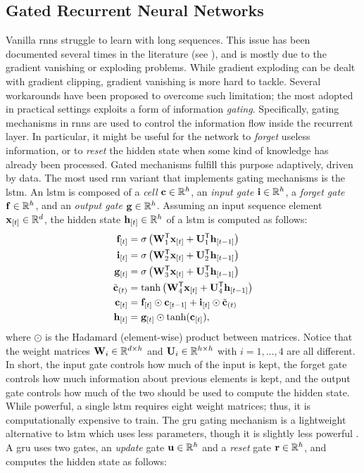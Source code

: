 \subsection{Gated Recurrent Neural Networks}
Vanilla \glspl{rnn} struggle to learn with long sequences. This issue has been documented several times in the literature (see \eg \cite{?}), and is mostly due to the gradient vanishing or exploding problems. While gradient exploding can be dealt with gradient clipping, gradient vanishing is more hard to tackle. Several workarounds have been proposed to overcome such limitation; the most adopted in practical settings exploits a form of information \emph{gating}. Specifically, gating mechanisms in \glspl{rnn} are used to control the information flow inside the recurrent layer. In particular, it might be useful for the network to \emph{forget} useless information, or to \emph{reset} the hidden state when some kind of knowledge has already been processed. Gated mechanisms fulfill this purpose adaptively, driven by data. The most used \gls{rnn} variant that implements gating mechanisms is the \gls{lstm}.
An \gls{lstm} is composed of a \emph{cell} $\Vector{c} \in \Real^h$, an \emph{input gate} $\Vector{i} \in \Real^h$, a \emph{forget gate} $\Vector{f} \in \Real^h$, and an \emph{output gate} $\Vector{g} \in \Real^h$. Assuming an input sequence element $\Elem{x}{t} \in \Real^d$, the hidden state $\Elem{h}{t} \in \Real^h$ of a \gls{lstm} is computed as follows:
\begin{align*}
    \Elem{f}{t} &= \sigma\Paren{\Matrix{W}_{1}^{\Transpose}\Elem{x}{t} + \Matrix{U}_{1}^{\Transpose}\Elem{h}{t-1}}\\
    \Elem{i}{t} &= \sigma\Paren{\Matrix{W}_{2}^{\Transpose}\Elem{x}{t} + \Matrix{U}_{2}^{\Transpose}\Elem{h}{t-1}}\\
    \Elem{g}{t} &= \sigma\Paren{\Matrix{W}_{3}^{\Transpose}\Elem{x}{t} + \Matrix{U}_{3}^{\Transpose}\Elem{h}{t-1}}\\
    \tilde{\Vector{c}}_{(t)} &= \Fun{tanh}\Paren{\Matrix{W}_{4}^{\Transpose}\Elem{x}{t} + \Matrix{U}_{4}^{\Transpose}\Elem{h}{t-1}}\\
    \Elem{c}{t} &= \Elem{f}{t} \odot \Elem{c}{t-1} + \Elem{i}{t} \odot \tilde{\Vector{c}}_{(t)}\\
    \Elem{h}{t} &= \Elem{g}{t} \odot \Fun{tanh}(\Elem{c}{t}),
\end{align*}
where $\odot$ is the Hadamard (element-wise) product between matrices. Notice that the weight matrices $\Matrix{W}_i \in \Real^{d \times h}$ and $\Matrix{U}_i \in \Real^{h \times h}$ with $i=1, \ldots, 4$ are all different. In short, the input gate controls how much of the input is kept, the forget gate controls how much information about previous elements is kept, and the output gate controls how much of the two should be used to compute the hidden state. While powerful, a single \gls{lstm} requires eight weight matrices; thus, it is computationally expensive to train. The \gls{gru} gating mechanism is a lightweight alternative to \gls{lstm} which uses less parameters, though it is slightly less powerful \cite{?}. A \gls{gru} uses two gates, an \emph{update} gate $\Vector{u} \in \Real^h$ and a \emph{reset} gate $\Vector{r} \in \Real^h$, and computes the hidden state as follows:
